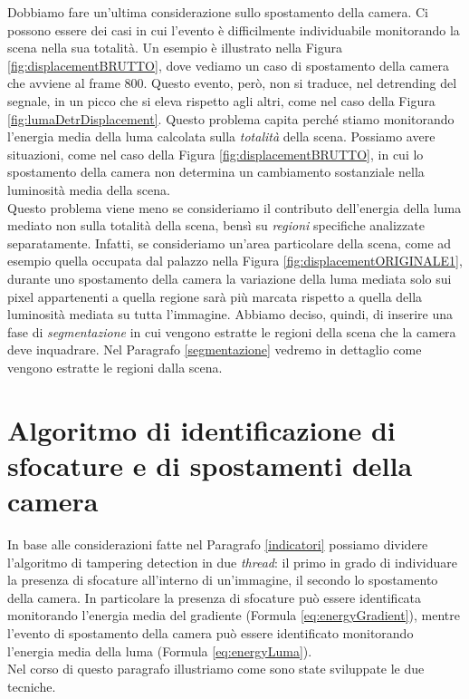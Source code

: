 Dobbiamo fare un'ultima considerazione sullo spostamento della camera.
Ci possono essere dei casi in cui l'evento \`e difficilmente individuabile monitorando la scena nella sua totalit\`a.
Un esempio \`e illustrato nella Figura \ref{fig:displacementBRUTTO}, dove vediamo un caso di spostamento della camera che avviene al frame $800$.
Questo evento, per\`o, non si traduce, nel detrending del segnale, in un picco che si eleva rispetto agli altri, come nel caso della Figura \ref{fig:lumaDetrDisplacement}.
Questo problema capita perch\'e stiamo monitorando l'energia media della luma calcolata sulla \textit{totalit\`a} della scena.
Possiamo avere situazioni, come nel caso della Figura \ref{fig:displacementBRUTTO}, in cui lo spostamento della camera non determina un cambiamento sostanziale nella luminosit\`a media della scena.\\
Questo problema viene meno se consideriamo il contributo dell'energia della luma mediato non sulla totalit\`a della scena, bens\`i su \textit{regioni} specifiche analizzate separatamente.
Infatti, se consideriamo un'area particolare della scena, come ad esempio quella occupata dal palazzo nella Figura \ref{fig:displacementORIGINALE1}, durante uno spostamento della camera la variazione della luma mediata solo sui pixel appartenenti a quella regione sar\`a pi\`u marcata rispetto a quella della luminosit\`a mediata su tutta l'immagine.
Abbiamo deciso, quindi, di inserire una fase di \textit{segmentazione} in cui vengono estratte le regioni della scena che la camera deve inquadrare. 
Nel Paragrafo \ref{segmentazione} vedremo in dettaglio come vengono estratte le regioni dalla scena.
\section{Algoritmo di identificazione di sfocature e di spostamenti della camera}
In base alle considerazioni fatte nel Paragrafo \ref{indicatori} possiamo dividere l'algoritmo di tampering detection in due \textit{thread}:
il primo in grado di individuare la presenza di sfocature all'interno di un'immagine, il secondo lo spostamento della camera.
In particolare la presenza di sfocature pu\`o essere identificata monitorando l'energia media del gradiente (Formula \eqref{eq:energyGradient}), mentre l'evento di spostamento della camera pu\`o essere identificato monitorando l'energia media della luma (Formula \eqref{eq:energyLuma}).\\
Nel corso di questo paragrafo illustriamo come sono state sviluppate le due tecniche.
